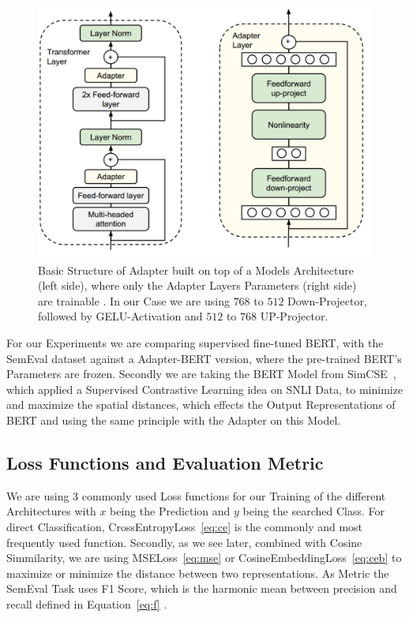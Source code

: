 \begin{figure}[!b]
    \centering
    \includegraphics[scale=0.28]{./content/Adapter_Architecture.png}
    \caption{Basic Structure of Adapter built on top of a Models Architecture (left side), where only the Adapter Layers Parameters (right side) are trainable \cite{zheng_learn_2023}.
             In our Case we are using $768$ to $512$ Down-Projector, followed by GELU-Activation and
             $512$ to $768$ UP-Projector.}
    \label{tab:adapt}
\end{figure}


For our Experiments we are comparing supervised fine-tuned BERT, with the SemEval dataset against
a Adapter-BERT version, where the pre-trained BERT's Parameters are frozen. Secondly we are
taking the BERT Model from SimCSE~\cite{gao_simcse_2022-1}, which applied a Supervised
Contrastive Learning idea on SNLI Data, to minimize and maximize the spatial distances,
which effects the Output Representations of BERT and using the same principle with the Adapter on this Model.







\subsection{Loss Functions and Evaluation Metric}
We are using 3 commonly used Loss functions for our Training of the different
Architectures with $x$ being the Prediction and $y$ being the searched Class. For direct Classification, 
CrossEntropyLoss~\ref{eq:ce} is the commonly and most frequently used function. Secondly, as we see later,
combined with Cosine Simmilarity, we are using MSELoss~\ref{eq:mse} or CosineEmbeddingLoss~\ref{eq:ceb}
to maximize or minimize the distance between two representations. As Metric the SemEval Task uses F1 Score, which
is the harmonic mean between precision and recall defined in Equation~\ref{eq:f} \cite{noauthor_nli4ct_nodate}.



